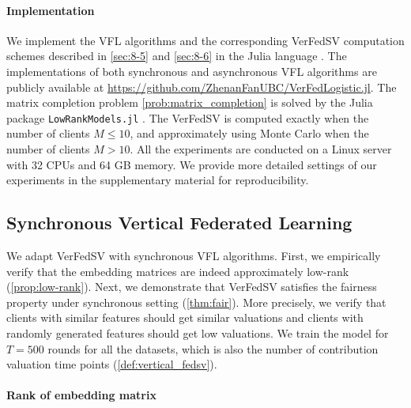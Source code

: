 \paragraph{Implementation} We implement the VFL algorithms and the corresponding VerFedSV computation schemes described in \autoref{sec:8-5} and \autoref{sec:8-6} in the Julia language \cite{bezanson2017julia}. The implementations of both synchronous and asynchronous VFL algorithms are publicly available at
\url{https://github.com/ZhenanFanUBC/VerFedLogistic.jl}. 
The matrix completion problem \eqref{prob:matrix_completion} is solved by the Julia package 
\texttt{LowRankModels.jl} \cite{glrm}.
The VerFedSV is computed exactly when the number of clients $M \leq 10$, and approximately using Monte Carlo when the number of clients $M > 10$. All the experiments are conducted on a Linux server with 32 CPUs and 64 GB memory. We provide more detailed settings of our experiments in the supplementary material for reproducibility.

\subsection{Synchronous Vertical Federated Learning} \label{sec:8-8-2}

We adapt VerFedSV with synchronous VFL algorithms. First, we empirically verify that the embedding matrices are indeed approximately low-rank (\autoref{prop:low-rank}). Next, we demonstrate that VerFedSV satisfies the fairness property under synchronous setting (\autoref{thm:fair}). More precisely, we verify that clients with similar features should get similar valuations and clients with randomly generated features should get low valuations. We train the model for $T = 500$ rounds for all the datasets, which is also the number of contribution valuation time points (\autoref{def:vertical_fedsv}).

\paragraph{Rank of embedding matrix}

